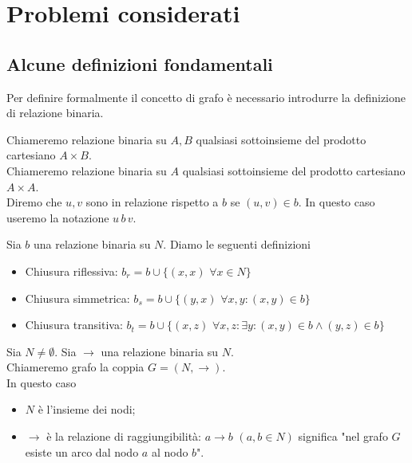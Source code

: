 \section{Problemi considerati}
\subsection{Alcune definizioni fondamentali}
Per definire formalmente il concetto di grafo è necessario introdurre la definizione di relazione binaria.
\begin{definition}
    Chiameremo relazione binaria su $A,B$ qualsiasi sottoinsieme del prodotto cartesiano $A \times B$.\\
    Chiameremo relazione binaria su $A$ qualsiasi sottoinsieme del prodotto cartesiano $A \times A$.\\
    Diremo che $u,v$ sono in relazione rispetto a $b$ se $(u,v) \in b$. In questo caso useremo la notazione $u \,b\, v$.
\end{definition}
\begin{definition}
    Sia $b$ una relazione binaria su $N$.
    Diamo le seguenti definizioni
    \begin{itemize}
        \item Chiusura riflessiva: $b_r = b \cup \{(x,x) \,\, \forall x \in N\}$
        \item Chiusura simmetrica: $b_s = b \cup \{(y,x) \,\, \forall x,y : (x,y) \in b\}$
        \item Chiusura transitiva: $b_t = b \cup \{(x,z) \,\, \forall x,z : \exists y : (x,y) \in b \land (y,z) \in b\}$
    \end{itemize}
\end{definition}
\begin{definition}
    Sia $N \neq \emptyset$. Sia $\to$ una relazione binaria su $N$.\\
    Chiameremo grafo la coppia $G = (N, \to)$.\\
    In questo caso
    \begin{itemize}
        \item $N$ è l'insieme dei nodi;
        \item $\to$ è la relazione di raggiungibilità: $a \to b \,\,(a,b \in N)$ significa "nel grafo $G$ esiste un arco dal nodo $a$ al nodo $b$".
    \end{itemize}
\end{definition}
